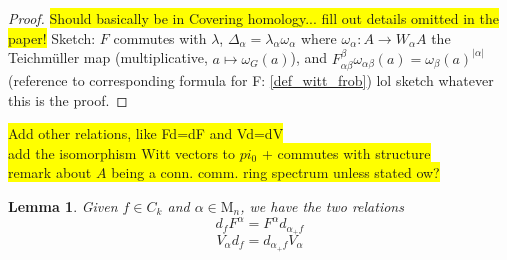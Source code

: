 \documentclass[10pt, a4paper, UKenglish]{article}
\numberwithin{equation}{section}
\newcommand{\abs}[1]{\left\vert#1\right\vert}	%
\newcommand{\M}{\mathrm{M}}
\newcommand{\comm}[1]{\colorbox{yellow}{#1}}
\theoremstyle{plain}
\newtheorem{lem}[equation]{Lemma}
\theoremstyle{definition}
\renewcommand{\to}{\longrightarrow}
\renewcommand{\mapsto}{\longmapsto}
\begin{document}
\begin{proof}
\comm{Should basically be in Covering homology... fill out details omitted in the paper!}
Sketch: $F$ commutes with $\lambda$, $\Delta_\alpha = \lambda_\alpha \omega_\alpha$ where $\omega_\alpha: A \to W_\alpha A$ the Teichm\"uller map (multiplicative, $a \mapsto \omega_G(a)$), and $F_{\alpha\beta}^\beta \omega_{\alpha\beta}(a) = \omega_\beta(a)^{\abs{\alpha}}$ (reference to corresponding formula for F: \ref{def_witt_frob}) lol sketch whatever this is the proof.
\end{proof}
%
%
\comm{Add other relations, like Fd=dF and Vd=dV}\\
\comm{add the isomorphism Witt vectors to $pi_0$ + commutes with structure}\\
\comm{remark about $A$ being a conn. comm. ring spectrum unless stated ow?}
\begin{lem}\label{lem_rel_V_d_F_d}
Given $f \in C_k$ and $\alpha \in \M_n$, we have the two relations
	\[ d_f F^\alpha = F^\alpha d_{\alpha_+ f} \]
	\[ V_\alpha d_f = d_{\alpha_+ f} V_\alpha \]
\end{lem}
%
%
\end{document}
